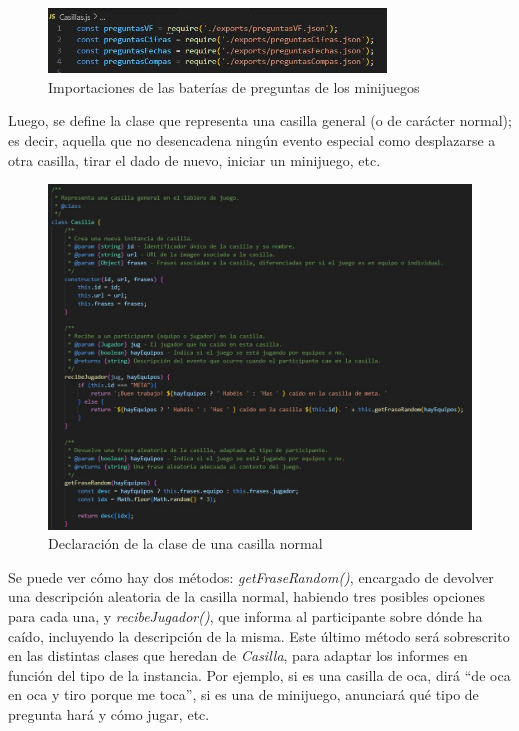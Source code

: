 \begin{figure}[H]
	\centering
	\includegraphics[width=0.8\textwidth]{imgs/codigo-casillas-1.jpg}
	\caption{Importaciones de las baterías de preguntas de los minijuegos}
	\label{fig:codigo-casillas-1}
\end{figure}

Luego, se define la clase que representa una casilla general (o de carácter normal); es decir, aquella que no desencadena ningún evento especial como desplazarse a otra casilla, tirar el dado de nuevo, iniciar un minijuego, etc.

\begin{figure}[H]
	\centering
	\includegraphics[width=1\textwidth]{imgs/codigo-casillas-2.jpg}
	\caption{Declaración de la clase de una casilla normal}
	\label{fig:codigo-casillas-2}
\end{figure}

Se puede ver cómo hay dos métodos: \textit{getFraseRandom()}, encargado de devolver una descripción aleatoria de la casilla normal, habiendo tres posibles opciones para cada una, y \textit{recibeJugador()}, que informa al participante sobre dónde ha caído, incluyendo la descripción de la misma. 
Este último método será sobrescrito en las distintas clases que heredan de \textit{Casilla}, para adaptar los informes en función del tipo de la instancia. Por ejemplo, si es una casilla de oca, dirá \enquote{de oca en oca y tiro porque me toca}, si es una de minijuego, anunciará qué tipo de pregunta hará y cómo jugar, etc.

